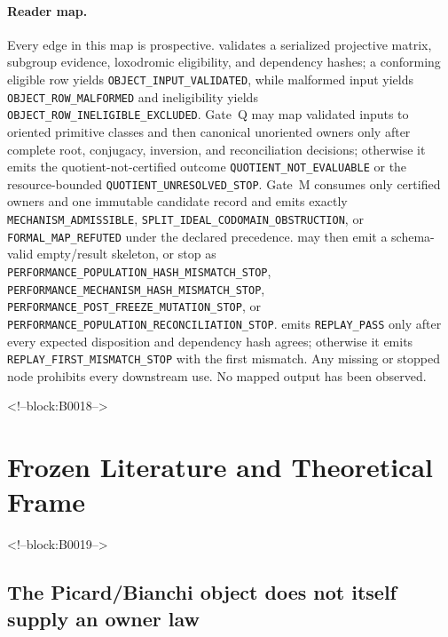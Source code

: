 \documentclass[11pt,a4paper]{article}
\begin{document}
\paragraph{Reader map.} Every edge in this map is prospective.  validates a serialized projective matrix, subgroup evidence, loxodromic eligibility, and dependency hashes; a conforming eligible row yields \texttt{OBJECT\_INPUT\_VALIDATED}, while malformed input yields \texttt{OBJECT\_ROW\_MALFORMED} and ineligibility yields \texttt{OBJECT\_ROW\_INELIGIBLE\_EXCLUDED}. Gate~Q may map validated inputs to oriented primitive classes and then canonical unoriented owners only after complete root, conjugacy, inversion, and reconciliation decisions; otherwise it emits the quotient-not-certified outcome \texttt{QUOTIENT\_NOT\_EVALUABLE} or the resource-bounded \texttt{QUOTIENT\_UNRESOLVED\_STOP}. Gate~M consumes only certified owners and one immutable candidate record and emits exactly \texttt{MECHANISM\_ADMISSIBLE}, \texttt{SPLIT\_\allowbreak{}IDEAL\_\allowbreak{}CODOMAIN\_\allowbreak{}OBSTRUCTION}, or \texttt{FORMAL\_MAP\_REFUTED} under the declared precedence.  may then emit a schema-valid empty/result skeleton, or stop as \texttt{PERFORMANCE\_POPULATION\_HASH\_MISMATCH\_STOP}, \texttt{PERFORMANCE\_\allowbreak{}MECHANISM\_\allowbreak{}HASH\_\allowbreak{}MISMATCH\_\allowbreak{}STOP}, \texttt{PERFORMANCE\_POST\_FREEZE\_MUTATION\_STOP}, or \texttt{PERFORMANCE\_\allowbreak{}POPULATION\_\allowbreak{}RECONCILIATION\_\allowbreak{}STOP}.  emits \texttt{REPLAY\_PASS} only after every expected disposition and dependency hash agrees; otherwise it emits \texttt{REPLAY\_\allowbreak{}FIRST\_\allowbreak{}MISMATCH\_\allowbreak{}STOP} with the first mismatch. Any missing or stopped node prohibits every downstream use. No mapped output has been observed.\par\endgroup

<!--block:B0018-->
\section{Frozen Literature and Theoretical Frame}

<!--block:B0019-->
\subsection{The Picard/Bianchi object does not itself supply an owner law}
\end{document}
